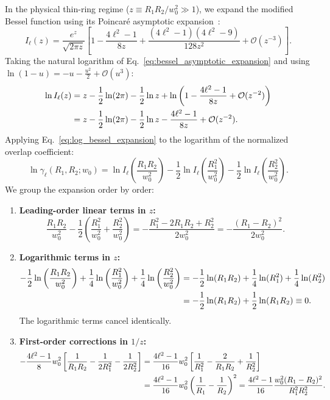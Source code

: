 \documentclass{optica-article}
\begin{document}
In the physical thin-ring regime ($z \equiv R_1 R_2 / w_0^2 \gg 1$), we expand the modified Bessel function using its Poincaré asymptotic expansion~\cite{Gradshteyn2014}:
\begin{equation}
I_\ell(z) = \frac{e^z}{\sqrt{2\pi z}} \left[ 1 - \frac{4\ell^2 - 1}{8z} + \frac{(4\ell^2 - 1)(4\ell^2 - 9)}{128 z^2} + \mathcal{O}(z^{-3}) \right].
\label{eq:bessel_asymptotic_expansion}
\end{equation}
Taking the natural logarithm of Eq.~\eqref{eq:bessel_asymptotic_expansion} and using $\ln(1 - u) = -u - \frac{u^2}{2} + \mathcal{O}(u^3)$:
\begin{align}
\ln I_\ell(z) &= z - \frac{1}{2}\ln(2\pi) - \frac{1}{2}\ln z + \ln\left( 1 - \frac{4\ell^2 - 1}{8z} + \mathcal{O}(z^{-2}) \right) \notag \\
&= z - \frac{1}{2}\ln(2\pi) - \frac{1}{2}\ln z - \frac{4\ell^2 - 1}{8z} + \mathcal{O}(z^{-2}).
\label{eq:log_bessel_expansion}
\end{align}
Applying Eq.~\eqref{eq:log_bessel_expansion} to the logarithm of the normalized overlap coefficient:
\begin{equation}
\ln \gamma_\ell(R_1, R_2; w_0) = \ln I_\ell\left( \frac{R_1 R_2}{w_0^2} \right) - \frac{1}{2} \ln I_\ell\left( \frac{R_1^2}{w_0^2} \right) - \frac{1}{2} \ln I_\ell\left( \frac{R_2^2}{w_0^2} \right).
\label{eq:log_gamma_expansion}
\end{equation}
We group the expansion order by order:
\begin{enumerate}
    \item \textbf{Leading-order linear terms in $z$:}
    \begin{equation}
    \frac{R_1 R_2}{w_0^2} - \frac{1}{2} \left( \frac{R_1^2}{w_0^2} + \frac{R_2^2}{w_0^2} \right) = - \frac{R_1^2 - 2 R_1 R_2 + R_2^2}{2 w_0^2} = - \frac{(R_1 - R_2)^2}{2 w_0^2}.
    \label{eq:linear_cancellation}
    \end{equation}
    \item \textbf{Logarithmic terms in $z$:}
    \begin{align}
    - \frac{1}{2} \ln\left( \frac{R_1 R_2}{w_0^2} \right) + \frac{1}{4} \ln\left( \frac{R_1^2}{w_0^2} \right) + \frac{1}{4} \ln\left( \frac{R_2^2}{w_0^2} \right) &= - \frac{1}{2} \ln(R_1 R_2) + \frac{1}{4} \ln(R_1^2) + \frac{1}{4} \ln(R_2^2) \notag \\
    &= - \frac{1}{2} \ln(R_1 R_2) + \frac{1}{2} \ln(R_1 R_2) \equiv 0.
    \label{eq:log_cancellation}
    \end{align}
    The logarithmic terms cancel identically.
    \item \textbf{First-order corrections in $1/z$:}
    \begin{align}
    - \frac{4\ell^2 - 1}{8} w_0^2 \left[ \frac{1}{R_1 R_2} - \frac{1}{2 R_1^2} - \frac{1}{2 R_2^2} \right] &= \frac{4\ell^2 - 1}{16} w_0^2 \left[ \frac{1}{R_1^2} - \frac{2}{R_1 R_2} + \frac{1}{R_2^2} \right] \notag \\
    &= \frac{4\ell^2 - 1}{16} w_0^2 \left( \frac{1}{R_1} - \frac{1}{R_2} \right)^2 = \frac{4\ell^2 - 1}{16} \frac{w_0^2 (R_1 - R_2)^2}{R_1^2 R_2^2}.
    \label{eq:correction_algebra}
    \end{align}
\end{enumerate}
\end{document}
